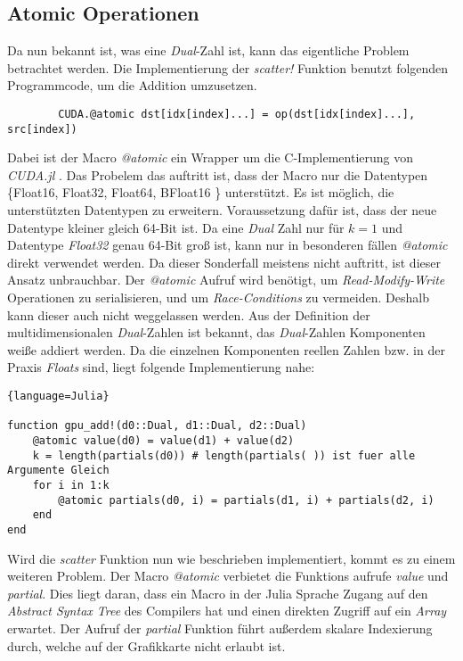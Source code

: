 \subsection{Atomic Operationen} \label{atomic}

Da nun bekannt ist, was eine \textit{Dual}-Zahl ist, 
kann das eigentliche Problem betrachtet werden.
Die Implementierung der \textit{scatter!} Funktion benutzt folgenden Programmcode, um die 
Addition umzusetzen.

\begin{verbatim}
    	CUDA.@atomic dst[idx[index]...] = op(dst[idx[index]...], src[index])
\end{verbatim}


Dabei ist der Macro \textit{@atomic} ein Wrapper um die C-Implementierung von \textit{CUDA.jl} \cite{besard2018juliagpu}.
Das Probelem das auftritt ist, dass der Macro nur die Datentypen \{Float16, Float32, Float64, BFloat16 \}
unterstützt.
Es ist möglich, die unterstützten Datentypen zu erweitern.
Voraussetzung dafür ist, dass der neue Datentype kleiner gleich 64-Bit ist.
Da eine \textit{Dual} Zahl nur für $k = 1$ und Datentype \textit{Float32} genau 64-Bit groß ist,
kann nur in besonderen fällen \textit{@atomic} direkt verwendet werden.
Da dieser Sonderfall meistens nicht auftritt, ist dieser Ansatz unbrauchbar.
Der \textit{@atomic} Aufruf wird benötigt,
um \textit{Read-Modify-Write} Operationen zu serialisieren, 
und um \textit{Race-Conditions} zu vermeiden. 
Deshalb kann dieser auch nicht weggelassen werden.
Aus der Definition der multidimensionalen \textit{Dual}-Zahlen 
ist bekannt, das \textit{Dual}-Zahlen Komponenten weiße addiert werden.
Da die einzelnen Komponenten reellen Zahlen 
bzw. in der Praxis \textit{Floats} sind, liegt folgende Implementierung nahe:

\begin{lstlisting}{language=Julia}

function gpu_add!(d0::Dual, d1::Dual, d2::Dual)
	@atomic value(d0) = value(d1) + value(d2)
	k = length(partials(d0)) # length(partials( )) ist fuer alle Argumente Gleich
	for i in 1:k
		@atomic partials(d0, i) = partials(d1, i) + partials(d2, i)
	end
end

\end{lstlisting}

Wird die \textit{scatter} Funktion nun wie beschrieben implementiert, kommt es zu einem weiteren Problem.
Der Macro \textit{@atomic} verbietet die Funktions aufrufe \textit{value} und \textit{partial}.
Dies liegt daran, dass ein Macro in der Julia Sprache Zugang auf den \textit{Abstract Syntax Tree} des Compilers hat
und einen direkten Zugriff auf ein \textit{Array} erwartet.
Der Aufruf der \textit{partial} Funktion führt außerdem skalare Indexierung durch, welche auf der Grafikkarte nicht erlaubt ist.